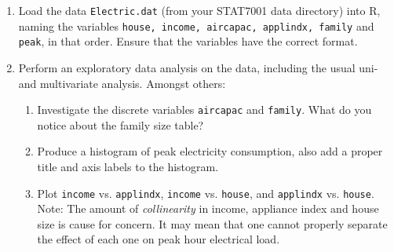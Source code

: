\begin{enumerate}

\item  Load the data {\tt Electric.dat} (from your STAT7001 data directory) into R, naming the variables {\tt house, income, aircapac, applindx, family} and {\tt peak}, in that order. Ensure that the variables have the correct format.
\item Perform an exploratory data analysis on the data, including the usual uni- and multivariate analysis. Amongst others:
\begin{enumerate}
\item Investigate the discrete variables {\tt aircapac} and {\tt family}. What do you notice about the family size table?
\item Produce a histogram of peak electricity consumption, also add a proper title and axis labels to the histogram.
\item Plot {\tt income} vs. {\tt applindx}, {\tt income} vs. {\tt house}, and {\tt applindx} vs. {\tt house}.
    Note: The amount of {\em collinearity} in income, appliance index and house size is cause for concern. It may mean that one cannot properly separate the effect of each one on peak hour electrical load.
\end{enumerate}


\end{enumerate}
